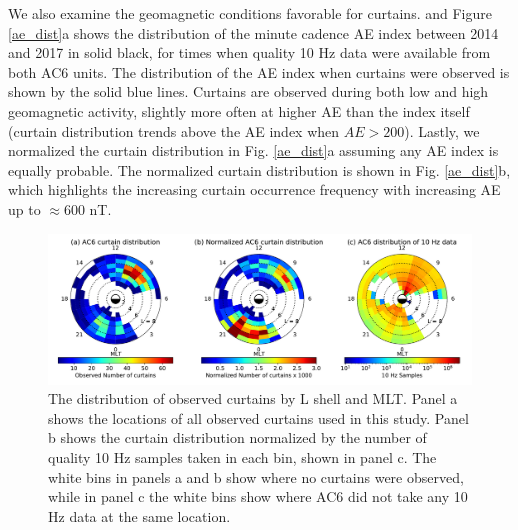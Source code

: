 \documentclass[draft]{agujournal2019}
\begin{document}
We also examine the geomagnetic conditions favorable for curtains.   and   Figure \ref{ae_dist}a shows the distribution of the minute cadence AE index between 2014 and 2017 in solid black, for times when quality 10 Hz data were available from both AC6 units. The distribution of the AE index when curtains were observed is shown by the solid blue lines. Curtains are observed during both low and high geomagnetic activity, slightly more often at higher AE than the index itself (curtain distribution trends above the AE index when $AE > 200$). Lastly, we normalized the curtain distribution in Fig. \ref{ae_dist}a assuming any AE index is equally probable. The normalized curtain distribution is shown in Fig. \ref{ae_dist}b, which highlights the increasing curtain occurrence frequency with increasing AE up to $\approx 600$ nT.

\begin{figure}
\includegraphics[width=\textwidth]{fig3_v3.pdf}
\caption{The distribution of observed curtains by L shell and MLT. Panel a shows the locations of all observed curtains used in this study. Panel b shows the curtain distribution normalized by the number of quality 10 Hz samples taken in each bin, shown in panel c. The white bins in panels a and b show where no curtains were observed, while in panel c the white bins show where AC6 did not take any 10 Hz data at the same location.}
\label{l_mlt_dist}
\end{figure}
\end{document}
